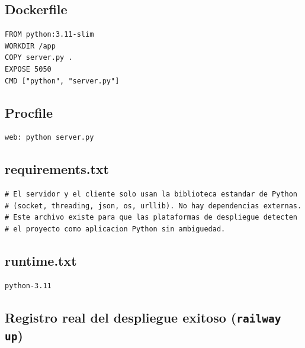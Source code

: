 \documentclass[12pt,a4paper]{article}
\begin{document}
\subsection{Dockerfile}

\begin{lstlisting}[style=consola,caption={Dockerfile usado para construir la imagen del contenedor},label={lst:dockerfile}]
FROM python:3.11-slim
WORKDIR /app
COPY server.py .
EXPOSE 5050
CMD ["python", "server.py"]
\end{lstlisting}

\subsection{Procfile}

\begin{lstlisting}[style=consola,caption={Procfile (comando de arranque alternativo, vía Nixpacks)}]
web: python server.py
\end{lstlisting}

\subsection{requirements.txt}

\begin{lstlisting}[style=consola,caption={requirements.txt: sin dependencias externas}]
# El servidor y el cliente solo usan la biblioteca estandar de Python
# (socket, threading, json, os, urllib). No hay dependencias externas.
# Este archivo existe para que las plataformas de despliegue detecten
# el proyecto como aplicacion Python sin ambiguedad.
\end{lstlisting}

\subsection{runtime.txt}

\begin{lstlisting}[style=consola,caption={runtime.txt: version de Python}]
python-3.11
\end{lstlisting}

\subsection{Registro real del despliegue exitoso (\texttt{railway up})}
\end{document}
